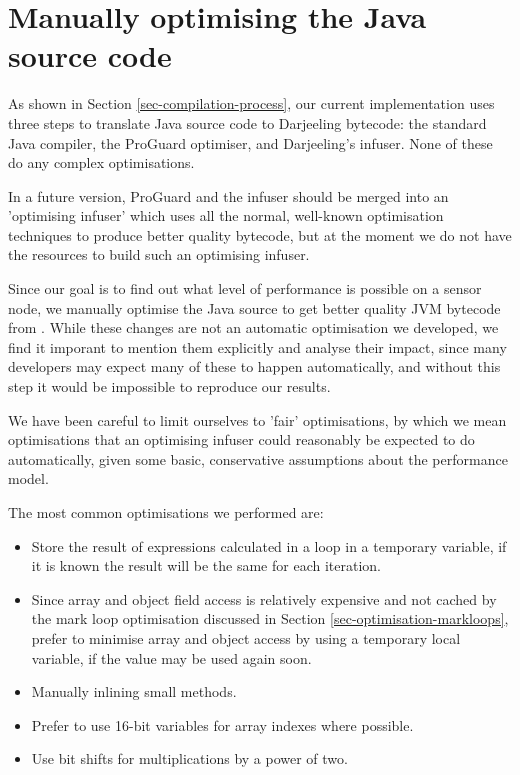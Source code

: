 \section{Manually optimising the Java source code}
\label{sec-optimisations-manual-java-source-optimisation}
As shown in Section \ref{sec-compilation-process}, our current implementation uses three steps to translate Java source code to Darjeeling bytecode: the standard Java compiler, the ProGuard optimiser, and Darjeeling's infuser. None of these do any complex optimisations. 

In a future version, ProGuard and the infuser should be merged into an 'optimising infuser' which uses all the normal, well-known optimisation techniques to produce better quality bytecode, but at the moment we do not have the resources to build such an optimising infuser.

Since our goal is to find out what level of performance is possible on a sensor node, we manually optimise the Java source to get better quality JVM bytecode from . While these changes are not an automatic optimisation we developed, we find it imporant to mention them explicitly and analyse their impact, since many developers may expect many of these to happen automatically, and without this step it would be impossible to reproduce our results.

We have been careful to limit ourselves to 'fair' optimisations, by which we mean optimisations that an optimising infuser could reasonably be expected to do automatically, given some basic, conservative assumptions about the performance model. 

The most common optimisations we performed are:
\begin{itemize}
	\item Store the result of expressions calculated in a loop in a temporary variable, if it is known the result will be the same for each iteration.
	\item Since array and object field access is relatively expensive and not cached by the mark loop optimisation discussed in Section \ref{sec-optimisation-markloops}, prefer to minimise array and object access by using a temporary local variable, if the value may be used again soon.
	\item Manually inlining small methods.
	\item Prefer to use 16-bit variables for array indexes where possible.
	\item Use bit shifts for multiplications by a power of two.
\end{itemize}

